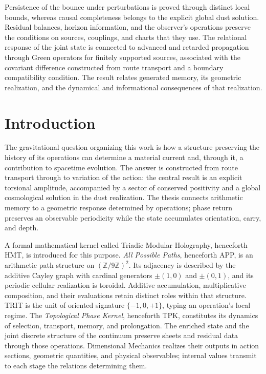 Persistence of the bounce under perturbations is proved through distinct
local bounds, whereas causal completeness belongs to the explicit global
dust solution. Residual balances, horizon information, and the observer's
operations preserve the conditions on sources, couplings, and charts
that they use. The relational response of the joint state is connected
to advanced and retarded propagation through Green operators for finitely
supported sources, associated with the covariant difference constructed
from route transport and a boundary
compatibility condition. The result relates generated memory, its
geometric realization, and the dynamical and informational consequences
of that realization.
\par\endgroup
\clearpage

\section{Introduction}
\label{vii:sec:introduccion}

The gravitational question organizing this work is how a structure
preserving the history of its operations can determine a material current
and, through it, a contribution to spacetime evolution. The answer is
constructed from route transport through to variation of the action:
the central result is an explicit torsional amplitude, accompanied by a
sector of conserved positivity and a global cosmological solution in the
dust realization. The thesis connects arithmetic memory to a geometric
response determined by operations; phase return preserves an observable
periodicity while the state accumulates orientation, carry, and depth.

A formal mathematical kernel called Triadic Modular Holography,
henceforth HMT, is introduced for this purpose. \emph{All Possible
Paths}, henceforth APP, is an arithmetic path structure on
\((\mathbb Z/9\mathbb Z)^2\). Its adjacency is described by the additive
Cayley graph with cardinal generators \(\pm(1,0)\) and \(\pm(0,1)\),
and its periodic cellular realization is toroidal. Additive
accumulation, multiplicative composition, and their evaluations retain
distinct roles within that structure. TRIT is the unit of oriented
signature \(\{-1,0,+1\}\), typing an operation's local regime. The
\emph{Topological Phase Kernel}, henceforth TPK, constitutes its dynamics
of selection, transport, memory, and prolongation. The enriched state and
the joint discrete structure of the continuum preserve sheets and
residual data through those operations. Dimensional Mechanics realizes
their outputs in action sections, geometric quantities, and physical
observables; internal values transmit to each stage the relations
determining them.


